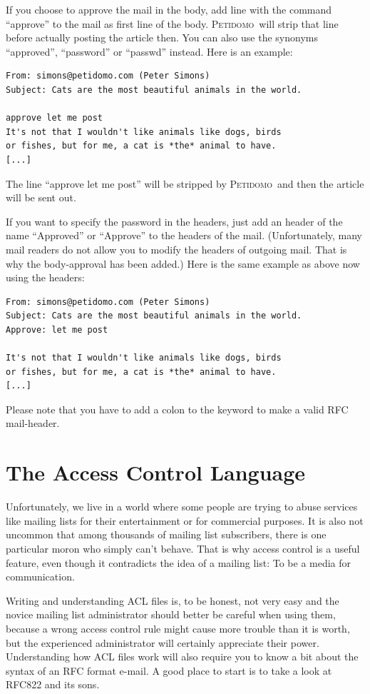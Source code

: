 \documentclass[a4paper,10pt]{scrreprt}
\newcommand{\Petidomo}{{\scshape Peti\-domo}}
\begin{document}
If you choose to approve the mail in the body, add line with the
command ``approve'' to the mail as first line of the body. \Petidomo\
will strip that line before actually posting the article then. You can
also use the synonyms ``approved'', ``password'' or ``passwd''
instead. Here is an example:
\begin{verbatim}
From: simons@petidomo.com (Peter Simons)
Subject: Cats are the most beautiful animals in the world.

approve let me post
It's not that I wouldn't like animals like dogs, birds
or fishes, but for me, a cat is *the* animal to have.
[...]
\end{verbatim}

The line ``approve let me post'' will be stripped by \Petidomo\ and
then the article will be sent out.

If you want to specify the password in the headers, just add an header
of the name ``Approved'' or ``Approve'' to the headers of the mail.
(Unfortunately, many mail readers do not allow you to modify the
headers of outgoing mail. That is why the body-approval has been
added.) Here is the same example as above now using the headers:
\begin{verbatim}
From: simons@petidomo.com (Peter Simons)
Subject: Cats are the most beautiful animals in the world.
Approve: let me post

It's not that I wouldn't like animals like dogs, birds
or fishes, but for me, a cat is *the* animal to have.
[...]
\end{verbatim}

Please note that you have to add a colon to the keyword to make a
valid RFC mail-header.


\chapter{The Access Control Language}

Unfortunately, we live in a world where some people are trying to
abuse services like mailing lists for their entertainment or for
commercial purposes. It is also not uncommon that among thousands of
mailing list subscribers, there is one particular moron who simply
can't behave. That is why access control is a useful feature, even
though it contradicts the idea of a mailing list: To be a media for
communication.

Writing and understanding ACL files is, to be honest, not very easy
and the novice mailing list administrator should better be careful
when using them, because a wrong access control rule might cause more
trouble than it is worth, but the experienced administrator will
certainly appreciate their power. Understanding how ACL files work
will also require you to know a bit about the syntax of an RFC format
e-mail. A good place to start is to take a look at RFC822 and its
sons.
\end{document}
